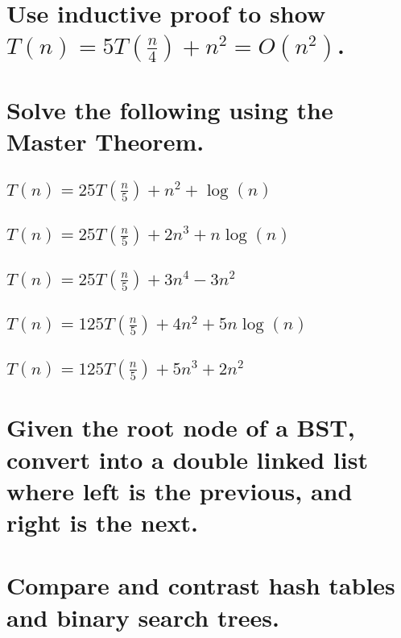 \documentclass{article}
\begin{document}
\section{Use inductive proof to show \(T(n) = 5T(\frac{n}{4}) + n^2 = O(n^2)\).}

\section{Solve the following using the Master Theorem.}
    \subsection{\(T(n) = 25T(\frac{n}{5}) + n^2 + \log(n)\)}
    \subsection{\(T(n) = 25T(\frac{n}{5}) + 2n^3 + n \log(n)\)}
    \subsection{\(T(n) = 25T(\frac{n}{5}) + 3n^4 - 3n^2\)}
    \subsection{\(T(n) = 125T(\frac{n}{5}) + 4n^2 + 5n \log(n)\)}
    \subsection{\(T(n) = 125T(\frac{n}{5}) + 5n^3 + 2n^2\)}

\section{Given the root node of a BST, convert into a double linked list where left is the previous, and right is the next.}

\section{Compare and contrast hash tables and binary search trees.}
\end{document}
